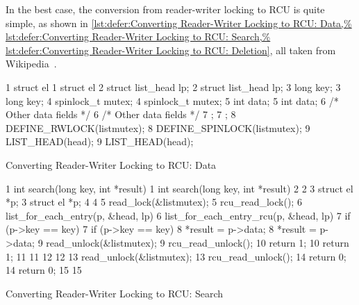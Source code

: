 In the best case, the conversion from reader-writer locking to RCU
is quite simple, as shown in
\cref{lst:defer:Converting Reader-Writer Locking to RCU: Data,%
lst:defer:Converting Reader-Writer Locking to RCU: Search,%
lst:defer:Converting Reader-Writer Locking to RCU: Deletion},
all taken from
Wikipedia~\cite{WikipediaRCU}.

\begin{listing*}
{ \scriptsize
\begin{verbbox}
 1 struct el {                           1 struct el {
 2   struct list_head lp;                2   struct list_head lp;
 3   long key;                           3   long key;
 4   spinlock_t mutex;                   4   spinlock_t mutex;
 5   int data;                           5   int data;
 6   /* Other data fields */             6   /* Other data fields */
 7 };                                    7 };
 8 DEFINE_RWLOCK(listmutex);             8 DEFINE_SPINLOCK(listmutex);
 9 LIST_HEAD(head);                      9 LIST_HEAD(head);
\end{verbbox}
}
\hspace*{0.9in}\OneColumnHSpace{-0.5in}
\IfEbookSize{\hspace*{-1.05in}}{}\theverbbox
\caption{Converting Reader-Writer Locking to RCU\@:
						    Data}
\label{lst:defer:Converting Reader-Writer Locking to RCU: Data}
\end{listing*}

\begin{listing*}
{ \scriptsize
\begin{verbbox}
 1 int search(long key, int *result)     1 int search(long key, int *result)
 2 {                                     2 {
 3   struct el *p;                       3   struct el *p;
 4                                       4
 5   read_lock(&listmutex);              5   rcu_read_lock();
 6   list_for_each_entry(p, &head, lp) { 6   list_for_each_entry_rcu(p, &head, lp) {
 7     if (p->key == key) {              7     if (p->key == key) {
 8       *result = p->data;              8       *result = p->data;
 9       read_unlock(&listmutex);        9       rcu_read_unlock();
10       return 1;                      10       return 1;
11     }                                11     }
12   }                                  12   }
13   read_unlock(&listmutex);           13   rcu_read_unlock();
14   return 0;                          14   return 0;
15 }                                    15 }
\end{verbbox}
}
\hspace*{0.9in}\OneColumnHSpace{-0.5in}
\IfEbookSize{\hspace*{-1.05in}}{}\theverbbox
\caption{Converting Reader-Writer Locking to RCU\@:
						    Search}
\label{lst:defer:Converting Reader-Writer Locking to RCU: Search}
\end{listing*}

